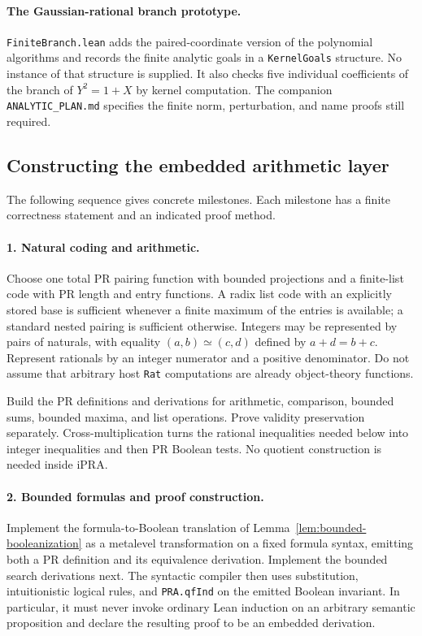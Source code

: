 \paragraph{The Gaussian-rational branch prototype.}
\texttt{FiniteBranch.lean} adds the paired-coordinate version of the
polynomial algorithms and records the finite analytic goals in a
\texttt{KernelGoals} structure. No instance of that structure is supplied.
It also checks five individual coefficients of the branch of $Y^2=1+X$
by kernel computation. The companion \texttt{ANALYTIC\_PLAN.md}
specifies the finite norm, perturbation, and name proofs still required.

\subsection{Constructing the embedded arithmetic layer}

The following sequence gives concrete milestones. Each milestone has
a finite correctness statement and an indicated proof method.

\paragraph{1. Natural coding and arithmetic.}
Choose one total PR pairing function with bounded projections and a
finite-list code with PR length and entry functions. A radix list code
with an explicitly stored base is sufficient whenever a finite maximum
of the entries is available; a standard nested pairing is sufficient
otherwise. Integers may be represented by pairs of naturals, with
equality $(a,b)\simeq(c,d)$ defined by $a+d=b+c$. Represent rationals by
an integer numerator and a positive denominator. Do not assume that
arbitrary host \texttt{Rat} computations are already object-theory
functions.

Build the PR definitions and derivations for arithmetic, comparison,
bounded sums, bounded maxima, and list operations. Prove validity
preservation separately. Cross-multiplication turns the rational
inequalities needed below into integer inequalities and then PR Boolean
tests. No quotient construction is needed inside iPRA.

\paragraph{2. Bounded formulas and proof construction.}
Implement the formula-to-Boolean translation of
Lemma~\ref{lem:bounded-booleanization} as a metalevel transformation
on a fixed formula syntax, emitting both a PR definition and its
equivalence derivation. Implement the bounded search derivations next.
The syntactic compiler then uses substitution, intuitionistic logical
rules, and \texttt{PRA.qfInd} on the emitted Boolean invariant. In
particular, it must never invoke ordinary Lean induction on an arbitrary
semantic proposition and declare the resulting proof to be an embedded
derivation.

